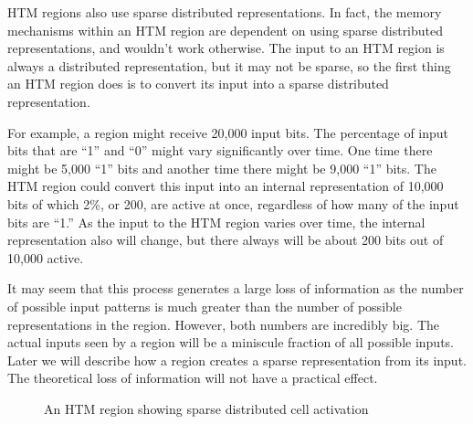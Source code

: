 \documentclass{report}
\begin{document}
HTM regions also use sparse distributed representations. In fact, the
memory mechanisms within an HTM region are dependent on using sparse
distributed representations, and wouldn't work otherwise. The input to
an HTM region is always a distributed representation, but it may not
be sparse, so the first thing an HTM region does is to convert its
input into a sparse distributed representation.

For example, a region might receive 20,000 input bits. The percentage
of input bits that are ``1'' and ``0'' might vary significantly over
time. One time there might be 5,000 ``1'' bits and another time there
might be 9,000 ``1'' bits. The HTM region could convert this input
into an internal representation of 10,000 bits of which 2\%, or 200,
are active at once, regardless of how many of the input bits are
``1.'' As the input to the HTM region varies over time, the internal
representation also will change, but there always will be about 200
bits out of 10,000 active.

It may seem that this process generates a large loss of information as
the number of possible input patterns is much greater than the number
of possible representations in the region. However, both numbers are
incredibly big. The actual inputs seen by a region will be a miniscule
fraction of all possible inputs. Later we will describe how a region
creates a sparse representation from its input. The theoretical loss
of information will not have a practical effect.

\begin{figure}
\caption{An HTM region showing sparse distributed cell activation}
\label{figure:sparse-activation}
\end{figure}
\end{document}
